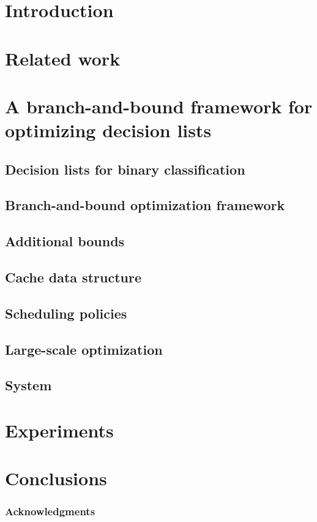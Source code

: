 \section{Introduction}

\section{Related work}

\citep{LethamRuMcMa15}

\citep{YangRuSe16}

\section{A branch-and-bound framework for optimizing decision lists}

\subsection{Decision lists for binary classification}

\subsection{Branch-and-bound optimization framework}

\subsection{Additional bounds}

\subsection{Cache data structure}
\label{sec:cache}

\subsection{Scheduling policies}

\subsection{Large-scale optimization}

\subsection{System}

\section{Experiments}

\section{Conclusions}

\subsubsection*{Acknowledgments}



